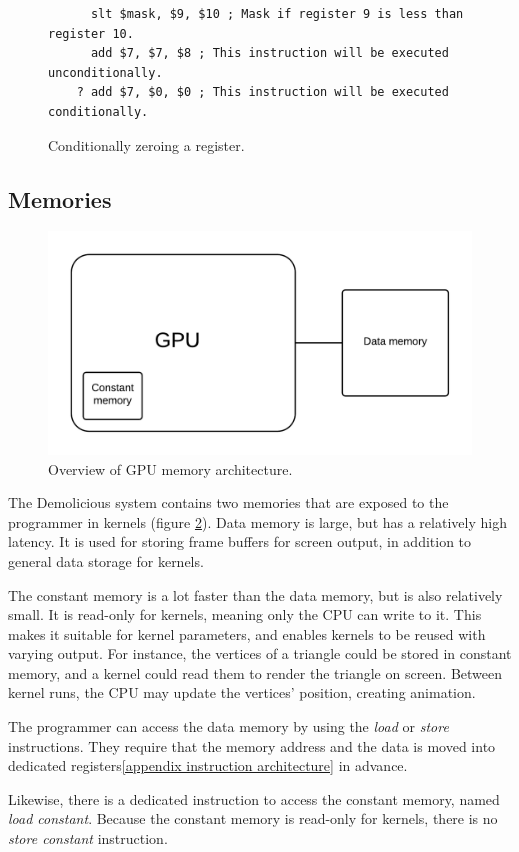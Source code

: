 \begin{figure}[H]
	\centering
	\begin{verbatim}
	  slt $mask, $9, $10 ; Mask if register 9 is less than register 10.
	  add $7, $7, $8 ; This instruction will be executed unconditionally.
	? add $7, $0, $0 ; This instruction will be executed conditionally.
	\end{verbatim}
	\caption{Conditionally zeroing a register.}
	\label{fig:conditional_execution}
\end{figure}

\subsection{Memories}

\begin{figure}[H]
	\centering
	\includegraphics[width=\textwidth]{../system_overview/diagrams/memory_overview.png}
	\caption{Overview of GPU memory architecture.}
	\label{fig:memory_overview}
\end{figure}

The Demolicious system contains two memories that are exposed to the programmer in kernels (figure \ref{fig:memory_overview}).
Data memory is large, but has a relatively high latency.
It is used for storing frame buffers for screen output,
in addition to general data storage for kernels.

The constant memory is a lot faster than the data memory, but is also relatively small.
It is read-only for kernels, meaning only the CPU can write to it.
This makes it suitable for kernel parameters, and enables kernels to be reused with varying output.
For instance, the vertices of a triangle could be stored in constant memory,
and a kernel could read them to render the triangle on screen.
Between kernel runs, the CPU may update the vertices' position, creating animation.

The programmer can access the data memory by using the \textit{load} or \textit{store} instructions.
They require that the memory address and the data is moved into dedicated registers\ref{appendix instruction architecture} in advance.

Likewise, there is a dedicated instruction to access the constant memory, named \textit{load constant}.
Because the constant memory is read-only for kernels, there is no \textit{store constant} instruction.
